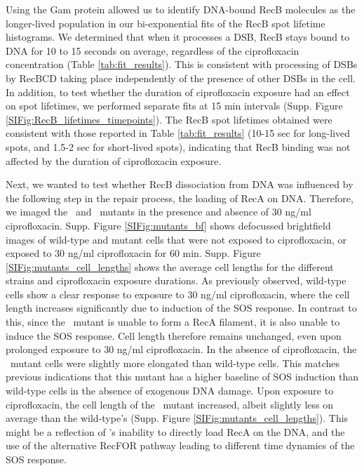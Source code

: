 Using the Gam protein allowed us to identify DNA-bound RecB molecules as the longer-lived population in our bi-exponential fits of the RecB spot lifetime histograms. We determined that when it processes a DSB, RecB stays bound to DNA for 10 to 15 seconds on average, regardless of the ciprofloxacin concentration (Table \ref{tab:fit_results}). This is consistent with processing of DSBs by RecBCD taking place independently of the presence of other DSBs in the cell. In addition, to test whether the duration of ciprofloxacin exposure had an effect on spot lifetimes, we performed separate fits at 15 min intervals (Supp. Figure \ref{SIFig:RecB_lifetimes_timepoints}). The RecB spot lifetimes obtained were consistent with those reported in Table \ref{tab:fit_results} (10-15 sec for long-lived spots, and 1.5-2 sec for short-lived spots), indicating that RecB binding was not affected by the duration of ciprofloxacin exposure.

Next, we wanted to test whether RecB dissociation from DNA was influenced by the following step in the repair process, the loading of RecA on DNA. Therefore, we imaged the \dreca\ and \geneteneighty\ mutants in the presence and absence of 30 ng/ml ciprofloxacin. Supp. Figure \ref{SIFig:mutants_bf} shows defocussed brightfield images of wild-type and mutant cells that were not exposed to ciprofloxacin, or exposed to 30 ng/ml ciprofloxacin for 60 min. Supp. Figure \ref{SIFig:mutants_cell_lengths} shows the average cell lengths for the different strains and ciprofloxacin exposure durations. As previously observed, wild-type cells show a clear response to exposure to 30 ng/ml ciprofloxacin, where the cell length increases significantly due to induction of the SOS response. In contrast to this, since the \dreca\ mutant is unable to form a RecA filament, it is also unable to induce the SOS response. Cell length therefore remains unchanged, even upon prolonged exposure to 30 ng/ml ciprofloxacin. In the absence of ciprofloxacin, the \geneteneighty\ mutant cells were slightly more elongated than wild-type cells. This matches previous indications that this mutant has a higher baseline of SOS induction than wild-type cells in the absence of exogenous DNA damage\cite{Lepore2023}. Upon exposure to ciprofloxacin, the cell length of the \geneteneighty\ mutant increased, albeit slightly less on average than the wild-type's (Supp. Figure \ref{SIFig:mutants_cell_lengths}). This might be a reflection of \teneighty's inability to directly load RecA on the DNA, and the use of the alternative RecFOR pathway leading to different time dynamics of the SOS response\cite{Ivancic-Bace_2003,Lepore2023}.

